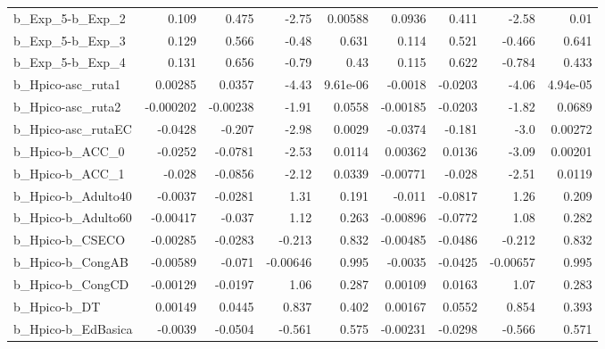\begin{tabular}{lrrrrrrrr}
b\_Exp\_5-b\_Exp\_2            &       0.109 &        0.475 &     -2.75 &  0.00588 &     0.0936 &       0.411 &        -2.58 &          0.01 \\
b\_Exp\_5-b\_Exp\_3            &       0.129 &        0.566 &     -0.48 &    0.631 &      0.114 &       0.521 &       -0.466 &         0.641 \\
b\_Exp\_5-b\_Exp\_4            &       0.131 &        0.656 &     -0.79 &     0.43 &      0.115 &       0.622 &       -0.784 &         0.433 \\
b\_Hpico-asc\_ruta1          &     0.00285 &       0.0357 &     -4.43 & 9.61e-06 &    -0.0018 &     -0.0203 &        -4.06 &      4.94e-05 \\
b\_Hpico-asc\_ruta2          &   -0.000202 &     -0.00238 &     -1.91 &   0.0558 &   -0.00185 &     -0.0203 &        -1.82 &        0.0689 \\
b\_Hpico-asc\_rutaEC         &     -0.0428 &       -0.207 &     -2.98 &   0.0029 &    -0.0374 &      -0.181 &         -3.0 &       0.00272 \\
b\_Hpico-b\_ACC\_0            &     -0.0252 &      -0.0781 &     -2.53 &   0.0114 &    0.00362 &      0.0136 &        -3.09 &       0.00201 \\
b\_Hpico-b\_ACC\_1            &      -0.028 &      -0.0856 &     -2.12 &   0.0339 &   -0.00771 &      -0.028 &        -2.51 &        0.0119 \\
b\_Hpico-b\_Adulto40         &     -0.0037 &      -0.0281 &      1.31 &    0.191 &     -0.011 &     -0.0817 &         1.26 &         0.209 \\
b\_Hpico-b\_Adulto60         &    -0.00417 &       -0.037 &      1.12 &    0.263 &   -0.00896 &     -0.0772 &         1.08 &         0.282 \\
b\_Hpico-b\_CSECO            &    -0.00285 &      -0.0283 &    -0.213 &    0.832 &   -0.00485 &     -0.0486 &       -0.212 &         0.832 \\
b\_Hpico-b\_CongAB           &    -0.00589 &       -0.071 &  -0.00646 &    0.995 &    -0.0035 &     -0.0425 &     -0.00657 &         0.995 \\
b\_Hpico-b\_CongCD           &    -0.00129 &      -0.0197 &      1.06 &    0.287 &    0.00109 &      0.0163 &         1.07 &         0.283 \\
b\_Hpico-b\_DT               &     0.00149 &       0.0445 &     0.837 &    0.402 &    0.00167 &      0.0552 &        0.854 &         0.393 \\
b\_Hpico-b\_EdBasica         &     -0.0039 &      -0.0504 &    -0.561 &    0.575 &   -0.00231 &     -0.0298 &       -0.566 &         0.571 \\

\end{tabular}
